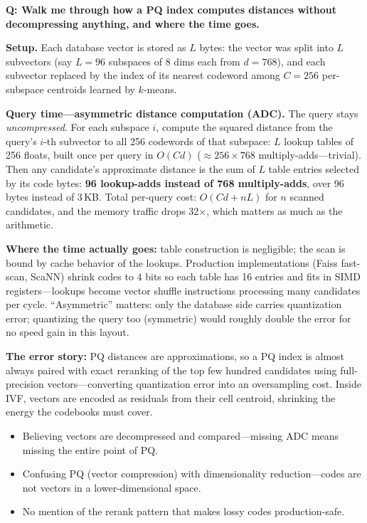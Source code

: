 \begin{interviewq}
\textbf{Q: Walk me through how a PQ index computes distances without decompressing anything, and where the time goes.}

 \quad {} \quad \badgefreq{\freqmed}

\stronganswer

\textbf{Setup.} Each database vector is stored as $L$ bytes: the vector was split into $L$ subvectors (say $L = 96$ subspaces of 8 dims each from $d = 768$), and each subvector replaced by the index of its nearest codeword among $C = 256$ per-subspace centroids learned by $k$-means.

\textbf{Query time---asymmetric distance computation (ADC).} The query stays \emph{uncompressed}. For each subspace $i$, compute the squared distance from the query's $i$-th subvector to all 256 codewords of that subspace: $L$ lookup tables of 256 floats, built once per query in $O(Cd)$ ($\approx 256 \times 768$ multiply-adds---trivial). Then any candidate's approximate distance is the sum of $L$ table entries selected by its code bytes: \textbf{96 lookup-adds instead of 768 multiply-adds}, over 96 bytes instead of 3\,KB. Total per-query cost: $O(Cd + nL)$ for $n$ scanned candidates, and the memory traffic drops 32$\times$, which matters as much as the arithmetic.

\textbf{Where the time actually goes:} table construction is negligible; the scan is bound by cache behavior of the lookups. Production implementations (Faiss fast-scan, ScaNN) shrink codes to 4 bits so each table has 16 entries and fits in SIMD registers---lookups become vector shuffle instructions processing many candidates per cycle. ``Asymmetric'' matters: only the database side carries quantization error; quantizing the query too (symmetric) would roughly double the error for no speed gain in this layout.

\textbf{The error story:} PQ distances are approximations, so a PQ index is almost always paired with exact reranking of the top few hundred candidates using full-precision vectors---converting quantization error into an oversampling cost. Inside IVF, vectors are encoded as residuals from their cell centroid, shrinking the energy the codebooks must cover.

\redflags
\begin{itemize}
    \item Believing vectors are decompressed and compared---missing ADC means missing the entire point of PQ.
    \item Confusing PQ (vector compression) with dimensionality reduction---codes are not vectors in a lower-dimensional space.
    \item No mention of the rerank pattern that makes lossy codes production-safe.
\end{itemize}


\end{interviewq}
